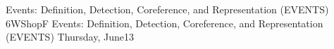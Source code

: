 \begin{wsschedule}
{Events: Definition, Detection, Coreference, and Representation (EVENTS)}
{6}{WShopF}
{Events: Definition, Detection, Coreference, and Representation (EVENTS)}
{Thursday, June13}{\WShopLocF}

\end{wsschedule}
